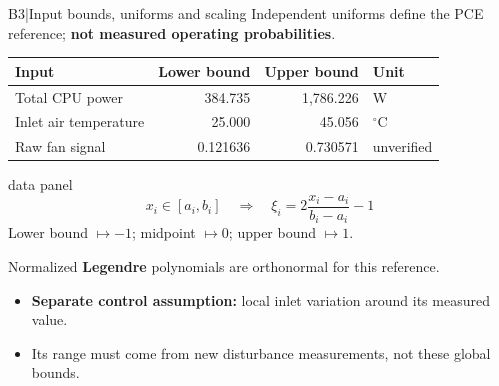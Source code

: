 \begin{frame}[more-space,label=backup-B3]{B3\enspace|\enspace Input bounds, uniforms and scaling}
  \small
  Independent uniforms define the PCE reference; \textbf{not measured operating probabilities}.
  \par\medskip
  {\renewcommand{\arraystretch}{1.35}
  \begin{tabular*}{\textwidth}{@{\extracolsep{\fill}}lrrl@{}}
    \toprule
    \textbf{Input} & \textbf{Lower bound} & \textbf{Upper bound} & \textbf{Unit}\\
    \midrule
    Total CPU power & 384.735 & 1,786.226 & W\\
    Inlet air temperature & 25.000 & 45.056 & ${}^\circ$C\\
    Raw fan signal & 0.121636 & 0.730571 & unverified\\
    \bottomrule
  \end{tabular*}}
  \smallskip
  \begin{beamercolorbox}[sep=1.5mm,wd=\textwidth]{data panel}
    \footnotesize
    \setlength{\abovedisplayskip}{2pt}
    \setlength{\belowdisplayskip}{2pt}
    \[
      x_i\in[a_i,b_i]\quad\Longrightarrow\quad
      \xi_i=2\frac{x_i-a_i}{b_i-a_i}-1
    \]
    Lower bound $\mapsto-1$; midpoint $\mapsto0$; upper bound $\mapsto1$.\par
    Normalized \textbf{Legendre} polynomials are orthonormal for this reference.
  \end{beamercolorbox}
  \smallskip
  {\footnotesize
  \begin{itemize}
    \setlength{\itemsep}{1pt}
    \vspace{-1.5mm}
    \item \textbf{Separate control assumption:} local inlet variation around its measured value.
    \item Its range must come from new disturbance measurements, not these global bounds.
  \end{itemize}
  \vspace{-1.5mm}}
\end{frame}

\renewcommand{\backupcode}{B4}

